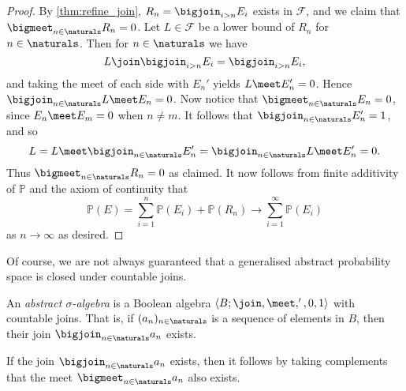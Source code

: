 \documentclass[article, a4paper, 11pt, oneside]{memoir}
\numberwithin{equation}{chapter}
\newcommand{\calF}{\mathcal{F}}
\renewcommand{\P}{\mathbb{P}}
\begin{document}
\begin{proof}
    By \cref{thm:refine_join}, $R_n = \bigjoin_{i > n} E_i$ exists in $\calF$, and we claim that $\bigmeet_{n\in\naturals} R_n = 0$. Let $L \in \calF$ be a lower bound of $R_n$ for $n \in \naturals$. Then for $n \in \naturals$ we have
    \begin{equation*}
        L \join \bigjoin_{i > n} E_i
            = \bigjoin_{i > n} E_i,
    \end{equation*}
    and taking the meet of each side with $E_n'$ yields $L \meet E_n' = 0$. Hence $\bigjoin_{n\in\naturals} L \meet E_n = 0$. Now notice that $\bigmeet_{n\in\naturals} E_n = 0$, since $E_n \meet E_m = 0$ when $n \neq m$. It follows that $\bigjoin_{n\in\naturals} E_n' = 1$, and so
    \begin{equation*}
        L
            = L \meet \bigjoin_{n\in\naturals} E_n'
            = \bigjoin_{n\in\naturals} L \meet E_n'
            = 0.
    \end{equation*}
    Thus $\bigmeet_{n\in\naturals} R_n = 0$ as claimed. It now follows from finite additivity of $\P$ and the axiom of continuity that
    \begin{equation*}
        \P(E)
            = \sum_{i=1}^n \P(E_i) + \P(R_n)
            \to \sum_{i=1}^\infty \P(E_i)
    \end{equation*}
    as $n \to \infty$ as desired.
\end{proof}

Of course, we are not always guaranteed that a generalised abstract probability space is closed under countable joins.


\begin{definition}
    An \emph{abstract $\sigma$-algebra} is a Boolean algebra $\langle B; \join, \meet, ', 0, 1 \rangle$ with countable joins. That is, if $(a_n)_{n\in\naturals}$ is a sequence of elements in $B$, then their join $\bigjoin_{n\in\naturals} a_n$ exists.
\end{definition}
%
If the join $\bigjoin_{n\in\naturals} a_n$ exists, then it follows by taking complements that the meet $\bigmeet_{n\in\naturals} a_n$ also exists.


\nocite{*}

\printbibliography
\end{document}
